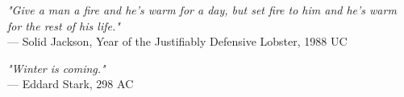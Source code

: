 \begin{flushright}
\emph{"Give a man a fire and he's warm for a day, but set fire to him and he's warm for the rest of his life."}\\
 — Solid Jackson, Year of the Justifiably Defensive Lobster, 1988 UC
\end{flushright}
\vspace{2em}
\begin{flushright}
\emph{"Winter is coming."}\\
 — Eddard Stark, 298 AC
\end{flushright}
